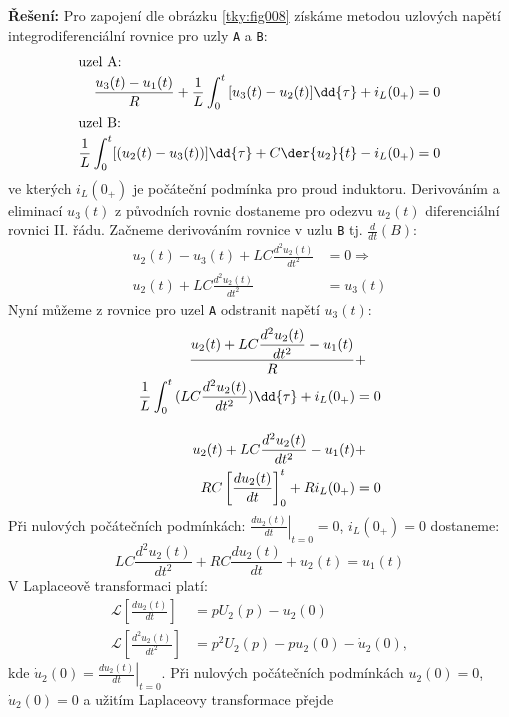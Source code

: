 \begin{tkyexam}
  \noindent\textbf{Řešení:} Pro zapojení dle obrázku \ref{tky:fig008} získáme metodou uzlových
  napětí integrodiferenciální rovnice pro uzly \texttt{A} a \texttt{B}:
  \begin{gather*}
    \begin{align*}
      \shortintertext{uzel A:}
      \frac{u_3(t)-u_1(t)}{R}+\frac{1}{L}\int_0^t{[u_3(t)-u_2(t)]}\dd{\tau}+i_L(0_+) &= 0  \\
      \shortintertext{uzel B:}
      \frac{1}{L}\int_0^t[(u_2(t)-u_3(t))]\dd{\tau}+C\der{u_2}{t}-i_L(0_+)           &= 0
    \end{align*}
  \end{gather*}
  ve kterých \(i_L(0_+)\) je počáteční podmínka pro proud induktoru. Derivováním a eliminací
  $u_3(t)$ z původních rovnic dostaneme pro odezvu $u_2(t)$ diferenciální rovnici II. řádu. Začneme
  derivováním rovnice v uzlu \texttt{B} tj. \(\frac{d}{dt}(B)\):
  \begin{align*}
    u_2(t)-u_3(t)+LC\frac{d^2u_2(t)}{dt^2} &=0 \Rightarrow   \\
    u_2(t)+LC\frac{d^2u_2(t)}{dt^2}        &=u_3(t)
  \end{align*}
  Nyní můžeme z rovnice pro uzel \texttt{A} odstranit napětí \(u_3(t)\):
  \begin{align*}
    \frac{u_2(t)+LC\dfrac{d^2u_2(t)}{dt^2}-u_1(t)}{R}             &+    \\
    \frac{1}{L}\int_0^t{(LC\frac{d^2u_2(t)}{dt^2})}\dd{\tau}+i_L(0_+) &=  0 \\
    \shortintertext{}
    u_2(t)+LC\frac{d^2u_2(t)}{dt^2}-u_1(t)                        &+    \\
    RC\left[\frac{du_2(t)}{dt}\right]_0^t+Ri_L(0_+)               &=  0
  \end{align*}
  Při nulových počátečních podmínkách: $\left.\frac{du_2(t)}{dt}\right\rvert_{t=0}=0$,
  $i_L(0_+)=0$ dostaneme:
  \begin{equation*}
    \boxed{LC\frac{d^2u_2(t)}{dt^2}+RC\frac{du_2(t)}{dt}+u_2(t)=u_1(t)}
  \end{equation*}
  V Laplaceově transformaci platí:
  \begin{align*}
    \mathcal{L}\left[\frac{du_2(t)}{dt}\right]     &= pU_2(p)-u_2(0) \\
    \mathcal{L}\left[\frac{d^2u_2(t)}{dt^2}\right] &= p^2U_2(p)-pu_2(0)-\dot{u}_2(0),
  \end{align*}
  kde \(\dot{u}_2(0)=\left.\frac{du_2(t)}{dt}\right\rvert_{t=0}\). Při nulových počátečních
  podmínkách \(u_2(0) = 0\), \(\dot{u}_2(0) = 0\) a užitím Laplaceovy transformace přejde

\end{tkyexam}
